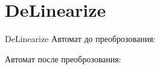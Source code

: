 \section{DeLinearize}
\begin{frame}{DeLinearize}
	Автомат до преоброзования:


	Автомат после преоброзования:


\end{frame}
